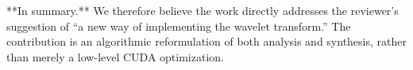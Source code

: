 \documentclass[11pt]{article}
\begin{document}
\begin{markdown}
**In summary.** We therefore believe the work directly addresses the reviewer’s suggestion of “a new way of implementing the wavelet transform.” The contribution is an algorithmic reformulation of both analysis and synthesis, rather than merely a low-level CUDA optimization.
\end{markdown}
\end{document}
